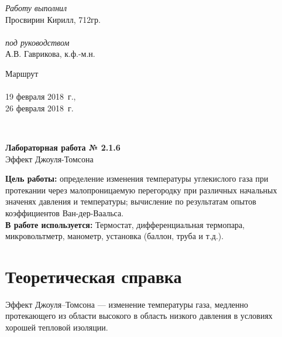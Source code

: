\documentclass[a4paper,12pt]{article} %
\newcommand{\RomanNumeralCaps}[1]
{\MakeUppercase{\romannumeral #1}}
\begin{document}
	
	
\begin{minipage}[l]{0.3\textwidth}
	\textit{Работу выполнил}\\
	Просвирин Кирилл, 712гр.\\\\
	\textit{под руководством}\\
	А.В. Гаврикова, к.ф.-м.н.
\end{minipage}
\hfill
\begin{minipage}[l]{0.22\textwidth}
	Маршрут \RomanNumeralCaps{9} \\\\
	19 февраля 2018~г.,\\
	26 февраля 2018~г.\\
\end{minipage}
\\[20pt]
\begin{center}
	\LARGE{\textbf{Лабораторная работа № 2.1.6}\\
	Эффект Джоуля-Томсона \\[20pt]}
\end{center}

\textbf{Цель работы: }определение изменения температуры углекислого газа
при протекании через малопроницаемую перегородку при различных начальных
значенях давления и температуры; вычисление по результатам опытов
коэффициентов Ван-дер-Ваальса.\\

\textbf{В работе используется: }Термостат, дифференциальная термопара,
микровольтметр, манометр, установка (баллон, труба и т.д.).


\section{Теоретическая справка}

Эффект Джоуля–Томсона — изменение температуры газа, медленно протекающего
из области высокого в область низкого давления в условиях хорошей тепловой
изоляции.\\
\end{document}
